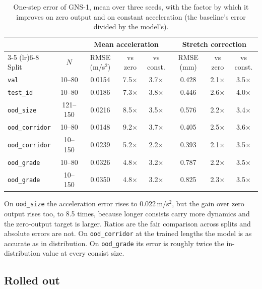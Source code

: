 \begin{table}[htbp]
    \centering
    \small
    \setlength{\tabcolsep}{4pt}
    \begin{tabular}{lccccccc}
        \toprule
        & & \multicolumn{3}{c}{Mean acceleration} & \multicolumn{3}{c}{Stretch correction} \\
        \cmidrule(lr){3-5} \cmidrule(lr){6-8}
        Split & $N$ & RMSE (m/s$^2$) & vs zero & vs const. & RMSE (mm) & vs zero & vs const. \\
        \midrule
        \texttt{val}           & 10--80  & 0.0154 & 7.5$\times$ & 3.7$\times$ & 0.428 & 2.1$\times$ & 3.5$\times$ \\
        \texttt{test\_id}      & 10--80  & 0.0186 & 7.3$\times$ & 3.8$\times$ & 0.446 & 2.6$\times$ & 4.0$\times$ \\
        \midrule
        \texttt{ood\_size}     & 121--150 & 0.0216 & 8.5$\times$ & 3.5$\times$ & 0.576 & 2.2$\times$ & 3.4$\times$ \\
        \texttt{ood\_corridor} & 10--80  & 0.0148 & 9.2$\times$ & 3.7$\times$ & 0.405 & 2.5$\times$ & 3.6$\times$ \\
        \texttt{ood\_corridor} & 10--150 & 0.0239 & 5.2$\times$ & 2.2$\times$ & 0.393 & 2.1$\times$ & 3.5$\times$ \\
        \texttt{ood\_grade}    & 10--80  & 0.0326 & 4.8$\times$ & 3.2$\times$ & 0.787 & 2.2$\times$ & 3.5$\times$ \\
        \texttt{ood\_grade}    & 10--150 & 0.0350 & 4.8$\times$ & 3.2$\times$ & 0.825 & 2.3$\times$ & 3.5$\times$ \\
        \bottomrule
    \end{tabular}
    \caption{One-step error of GNS-1, mean over three seeds, with the factor by which it improves on zero output and on constant acceleration (the baseline's error divided by the model's).}
    \label{tab:train_one_step}
\end{table}

On \texttt{ood\_size} the acceleration error rises to 0.022\,m/s$^2$, but the gain over zero output rises too, to 8.5 times, because longer consists carry more dynamics and the zero-output target is larger. Ratios are the fair comparison across splits and absolute errors are not. On \texttt{ood\_corridor} at the trained lengths the model is as accurate as in distribution. On \texttt{ood\_grade} its error is roughly twice the in-distribution value at every consist size.

\subsection{Rolled out}

